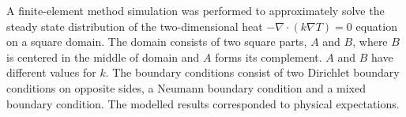 A finite-element method simulation was performed to approximately solve the steady state distribution of the  two-dimensional heat $-\nabla \cdot (k\nabla T) = 0$ equation on a square domain. The domain consists of two square parts, $A$ and $B$, where $B$ is centered in the middle of domain and $A$ forms its complement. $A$ and $B$ have different values for $k$. The boundary conditions consist of two Dirichlet boundary conditions on opposite sides, a Neumann boundary condition and a mixed boundary condition. The modelled results corresponded to physical expectations.